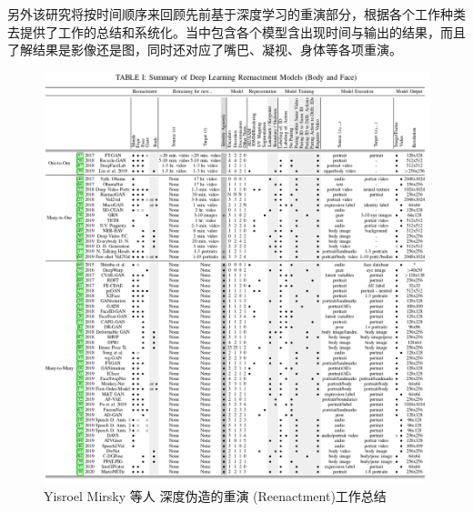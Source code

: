 另外该研究将按时间顺序来回顾先前基于深度学习的重演部分，根据各个工作种类去提供了工作的总结和系统化。当中包含各个模型含出现时间与输出的结果，而且了解结果是影像还是图，同时还对应了嘴巴、凝视、身体等各项重演。

\begin{figure}[htb]
\centering 
\includegraphics[width=1.10\textwidth]{img/ch4m5.png} 
\caption{ Yisroel Mirsky 等人 \cite{DBLP:journals/corr/abs-2004-11138} 深度伪造的重演 (Reenactment)工作总结}
\label{Test}
\end{figure}

